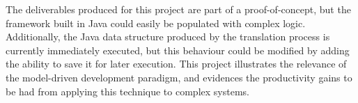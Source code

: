 \documentclass[11pt, a4paper, oneside, openright]{article}
\begin{document}
The deliverables produced for this project are part of a proof-of-concept,
but the framework built in Java could easily be populated with complex
logic. Additionally, the Java data structure produced by the translation process
is currently immediately executed, but this behaviour could be modified by adding the
ability to save it for later execution. This project
illustrates the relevance of the model-driven development paradigm, and evidences the
productivity gains to be had from applying this technique to complex systems.


\backmatter

%


\end{document}
